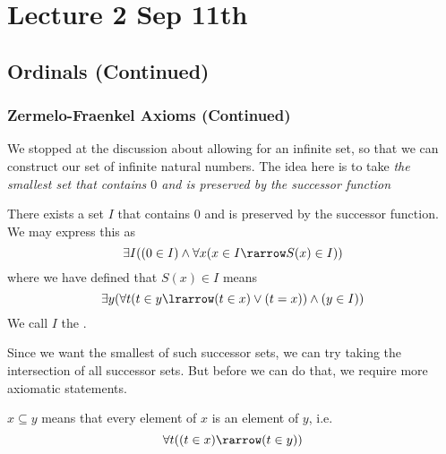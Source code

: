 \documentclass[notoc,notitlepage]{tufte-book}
\begin{document}



\chapter{Lecture 2 Sep 11th}%
\label{chp:lecture_2_sep_11th}

\section{Ordinals (Continued)}%
\label{sec:ordinals_continued}

\subsection{Zermelo-Fraenkel Axioms (Continued)}%
\label{sub:zermelo_fraenkel_axioms_continued}

We stopped at the discussion about allowing for an infinite set, so that we can construct our set of infinite natural numbers. The idea here is to take \textit{the smallest set that contains $0$ and is preserved by the successor function}

\begin{axiom}
\label{axiom:infinity_axiom}
  There exists a set $I$ that contains $0$ and is preserved by the successor function. We may express this as
  \begin{equation*}
    \exists I ( ( 0 \in I ) \land \forall x ( x \in I \rarrow S(x) \in I ) )
  \end{equation*}
  where we have defined that $S(x) \in I$ means
  \begin{equation*}
    \exists y ( \forall t ( t \in y \lrarrow (t \in x) \lor ( t = x ) ) \land (y \in I) )
  \end{equation*}
  We call $I$ the .
\end{axiom}

Since we want the smallest of such successor sets, we can try taking the intersection of all successor sets. But before we can do that, we require more axiomatic statements.

\begin{defn}[Subsets]
\label{defn:subsets}
  $x \subseteq y$ means that every element of $x$ is an element of $y$, i.e.
  \begin{equation*}
    \forall t ( ( t \in x ) \rarrow ( t \in y ) )
  \end{equation*}
\end{defn}
\end{document}
